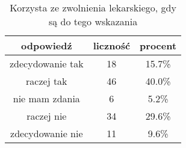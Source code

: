\begin{table}[H]
\caption{Korzysta ze zwolnienia lekarskiego, gdy są do tego wskazania}
\centering
\begin{tabular}{ | c | c | c |}
\hline
odpowiedź & liczność & procent\\
\hline
zdecydowanie tak  &  18  & 15.7\% \\
\hline
raczej tak  &  46  & 40.0\% \\
\hline
nie mam zdania  &  6  & 5.2\% \\
\hline
raczej nie  &  34  & 29.6\% \\
\hline
zdecydowanie nie  &  11  & 9.6\% \\
\hline
\end{tabular}
\label{tab:Q32}
\end{table}
